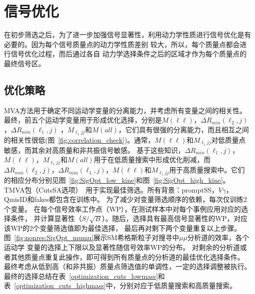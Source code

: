 \chapter{信号优化}\label{chap:signal_optimization}
在初步筛选之后，为了进一步加强信号显著性，利用动力学性质进行信号优化是有必要的。因为每个信号质量点的动力学性质差别
较大，所以，每个质量点都会进行信号优化过程，而后通过各自
动力学选择条件之后的区域才作为每个质量点的最终信号区。

\section{优化策略}
MVA方法用于确定不同运动学变量的分离能力，并考虑所有变量之间的相关性。最终，前五个运动学变量用于形成优化选择，分别是$M(\ell\ell)$，$\Delta R_{min}(\ell_{2}, j)$，$\Delta R_{min}(\ell_{1}, j)$ ，$ M_{\ell_{1} jj}$和$M(all)$，它们具有很强的分离能力，而且相互之间的相关性很低(图~\ref{fig:correlation_check})。通常，$M(\ell\ell)$和$ M_{\ell_{1} jj} $对低质量点敏感，而其余对高质量和非共振信号敏感。
基于这些知识，$\Delta R_{min}(\ell_{1}, j)$，$M(\ell\ell)$，$ M_{\ell_{1}jj}$和$M(all)$用于在低质量搜索中形成优化削减，而$\Delta R_{min}(\ell_{2}, j)$，$\Delta R_{min}(\ell_{1}, j)$，$M(\ell\ell)$和$M_{\ell_{1}jj}$用于高质量搜索中。它们的相应分布分别见图~\ref{fig:SigOpt_low_kine}和图~\ref{fig:SigOpt_high_kine}。\\
TMVA包（CutsSA选项）~\cite{Hocker:2007ht}用于实现最佳筛选。所有背景：promptSS，$V\gamma$，QmisID和fakes都包含在训练中。
为了减少对变量筛选顺序的依赖，每次仅训练2个变量。
在每个信号效率工作点（WP），在测试样本中对每个事例应用对应的选择条件，
并计算显著性（$S/\sqrt{B}$）。随后，选择具有最高信号显著性的WP，对应该WP的2个变量筛选值即为最佳选择，
最后再对剩下两个变量重复以上步骤。图~\ref{fig:nonres:SigOpt_mumu}展示SM希格斯粒子对搜寻中$\mu\mu$分析道的效率，各个运动学
变量的选择上下限以及显著性随信号效率WP的分布。
对剩余的分析道或者其他质量点重复此操作，即可得到所有质量点的分析道的最佳优化选择条件。 \\
最终考虑从低到高（和非共振）质量点筛选值的单调性，一定的选择调整被执行。最终的选择总结在表~\ref{optimization_cuts_lowmass}和表~\ref {optimization_cuts_highmass}中，分别对应于低质量搜索和高质量搜索。

